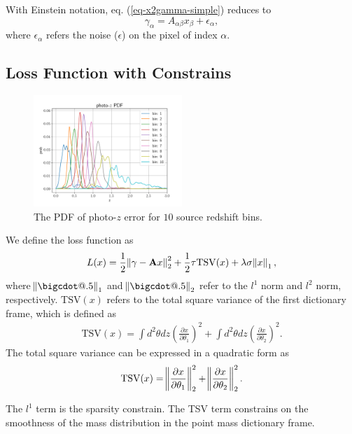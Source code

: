 \documentclass[twocolumn]{aastex62}
\makeatletter
\newcommand*\bigcdot{\mathpalette\bigcdot@{.5}}
\newcommand*\bigcdot@[2]{\mathbin{\vcenter{\hbox{\scalebox{#2}{$\m@th#1\bullet$}}}}}
\makeatother
\begin{document}
With Einstein notation, eq. (\ref{eq-x2gamma-simple}) reduces to
\begin{equation}
\gamma_{\alpha} = A_{\alpha\beta} x_{\beta} + \epsilon_{\alpha},
\end{equation}
where $\epsilon_{\alpha}$ refers the noise ($\epsilon$) on the pixel of index $\alpha$.

\subsection{Loss Function with Constrains}
\label{subsec:method-lossfun}
\begin{figure}
 \centering
 \includegraphics[width=0.5\textwidth]{mlz-poz.pdf}
 \caption{The PDF of photo-$z$ error for $10$ source redshift bins.}
\end{figure}

We define the loss function as
\begin{equation}\label{eq-lossFun}
L(x) = \frac{1}{2} \norm{\gamma-\mathbf{A}x}^2_2 + \frac{1}{2}\tau \mathrm{TSV}(x)+\lambda \sigma \norm{x}_1 ,
\end{equation}
where $\norm{\bigcdot}_1$ and $\norm{\bigcdot}_2$ refer to the $l^1$ norm and $l^2$ norm, respectively. 
$\mathrm{TSV}(x)$ refers to the total square variance of the first dictionary frame, which is defined as
\begin{equation}
\begin{split}
\mathrm{TSV}(x) =\int d^2 \theta dz (\frac{\partial x}{\partial \theta_1})^2+\int d^2 \theta dz (\frac{\partial x}{\partial \theta_2})^2.
\end{split}
\end{equation}
The total square variance can be expressed in a quadratic form as
\begin{equation}
\mathrm{TSV}(x)=\norm{\frac{\partial x}{\partial \theta_1}}^2_2+\norm{\frac{\partial x}{\partial \theta_2}}^2_2.
\end{equation}

The $l^1$ term is the sparsity constrain. The TSV term constrains on the smoothness of the mass distribution in the 
point mass dictionary frame.
\end{document}
